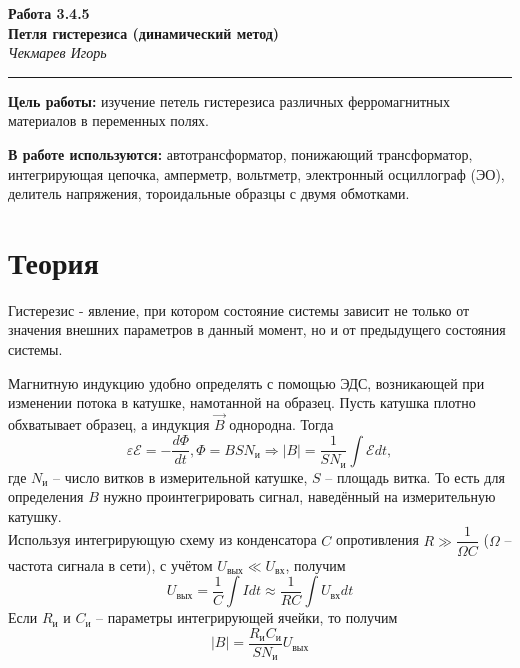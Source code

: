 \documentclass[12pt]{article}
\begin{document}
\begin{center}
  \LARGE\textbf{Работа 3.4.5}\\[0.3cm]
  \LARGE\textbf{Петля гистерезиса (динамический метод)}\\[0.4cm]
  \large\textit{Чекмарев Игорь}\\[0.2cm]
  \rule{\textwidth}{0.4pt}
\end{center}

\vspace{0.5cm}

\noindent\textbf{Цель работы:} изучение петель гистерезиса различных ферромагнитных материалов в переменных полях.

\vspace{0.3cm}

\noindent\textbf{В работе используются:} автотрансформатор, понижающий трансформатор, интегрирующая цепочка, амперметр, вольтметр, электронный осциллограф (ЭО), делитель напряжения, тороидальные образцы с двумя обмотками.

\section*{Теория}
Гистерезис - явление, при котором состояние системы зависит не только от значения внешних параметров в данный момент, но и от предыдущего состояния системы.

Магнитную индукцию удобно определять с помощью ЭДС, возникающей при изменении потока в катушке, намотанной на образец. Пусть катушка плотно обхватывает образец, а индукция $\vec{B}$ однородна. Тогда
$$
\varepsilon \mathscr{E} = -\dfrac{d\Phi}{dt}, \Phi = BSN_\text{и} \Rightarrow |B|=\dfrac{1}{SN_\text{и}}\int \mathscr{E}dt,
$$
где $N_\text{и}$ -- число витков в измерительной катушке, $S$ -- площадь витка. То есть для определения $B$ нужно проинтегрировать сигнал, наведённый на измерительную катушку.\\
Используя интегрирующую схему из конденсатора $C$ опротивления $R \gg \dfrac{1}{\Omega C}$ ($\Omega$ -- частота сигнала в сети), с учётом $U_{\text{вых}} \ll U_{\text{вх}}$, получим
$$
U_{\text{вых}}=\dfrac{1}{C}\int Idt \approx \dfrac{1}{RC}\int U_{\text{вх}}dt
$$
Если $R_{\text{и}}$ и $C_{\text{и}}$ -- параметры интегрирующей ячейки, то получим
$$
|B| = \dfrac{R_{\text{и}}C_{\text{и}}}{SN_\text{и}}U_{\text{вых}}
$$
\end{document}
